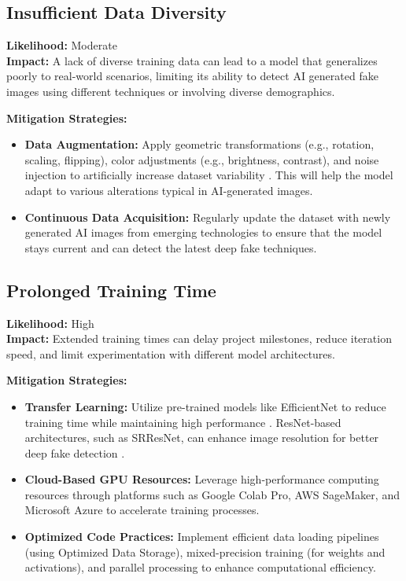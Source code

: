 \documentclass{article} %
\begin{document}
\subsection{Insufficient Data Diversity}
\textbf{Likelihood:} Moderate \\
\textbf{Impact:} A lack of diverse training data can lead to a model that generalizes poorly to real-world scenarios, limiting its ability to detect AI generated fake images using different techniques or involving diverse demographics.

\textbf{Mitigation Strategies:}
\begin{itemize}
    \item \textbf{Data Augmentation:} Apply geometric transformations (e.g., rotation, scaling, flipping), color adjustments (e.g., brightness, contrast), and noise injection to artificially increase dataset variability \citep{shorten2019}. This will help the model adapt to various alterations typical in AI-generated images.
    \item \textbf{Continuous Data Acquisition:} Regularly update the dataset with newly generated AI images from emerging technologies to ensure that the model stays current and can detect the latest deep fake techniques.
\end{itemize}

\subsection{Prolonged Training Time}
\textbf{Likelihood:} High \\
\textbf{Impact:} Extended training times can delay project milestones, reduce iteration speed, and limit experimentation with different model architectures.

\textbf{Mitigation Strategies:}
\begin{itemize}
    \item \textbf{Transfer Learning:} Utilize pre-trained models like EfficientNet to reduce training time while maintaining high performance \citep{tan2019}. ResNet-based architectures, such as SRResNet, can enhance image resolution for better deep fake detection \citep{ledig2017}.
    \item \textbf{Cloud-Based GPU Resources:} Leverage high-performance computing resources through platforms such as Google Colab Pro, AWS SageMaker, and Microsoft Azure to accelerate training processes.
    \item \textbf{Optimized Code Practices:} Implement efficient data loading pipelines (using Optimized Data Storage), mixed-precision training (for weights and activations), and parallel processing to enhance computational efficiency.
\end{itemize}
\end{document}
